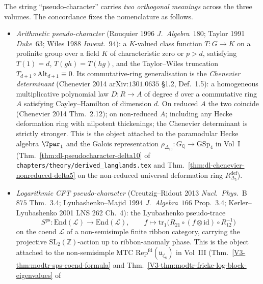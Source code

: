 \begin{description}[itemsep=4pt, leftmargin=2.0em, style=nextline]
\item[T6 (arithmetic pseudo-character vs LCFT pseudo-character).]
%
%
%
%
The string ``pseudo-character'' carries \emph{two orthogonal meanings}
across the three volumes. The concordance
fixes the nomenclature as follows.
\begin{itemize}
 \item \emph{Arithmetic pseudo-character} (Rouquier 1996
 \emph{J.\ Algebra}~$180$; Taylor 1991 \emph{Duke}~$63$; Wiles 1988
 \emph{Invent.}~$94$): a $K$-valued class function $T\colon G\to K$
 on a profinite group over a field $K$ of characteristic zero or
 $p>d$, satisfying $T(1)=d$, $T(gh)=T(hg)$, and the Taylor--Wiles
 truncation $T_{d+1}\circ\mathrm{Alt}_{d+1}\equiv 0$. Its
 commutative-ring generalisation is the \emph{Chenevier determinant}
 (Chenevier 2014 arXiv:$1301.0635$ \S1.2, Def.~1.5): a homogeneous
 multiplicative polynomial law $D\colon R\to A$ of degree $d$ over
 a commutative ring $A$ satisfying Cayley--Hamilton of dimension
 $d$. On reduced $A$ the two coincide (Chenevier 2014 Thm.~2.12); on
 non-reduced $A$; including any Hecke deformation ring with
 nilpotent thickenings; the Chenevier determinant is strictly
 stronger. This is the object attached to the paramodular Hecke
 algebra $\Tpar_1$ and the Galois representation
$\rho_{\Delta_{10}}\colon G_{\mathbb Q}\to\mathrm{GSp}_4$ in
Vol~I (Thm.~\ref{thm:dl-pseudocharacter-delta10} of
\texttt{chapters/theory/derived\_langlands.tex} and
Thm.~\ref{thm:dl-chenevier-nonreduced-delta5} on the non-reduced
universal deformation ring $R^{\mathrm{def}}_{\Delta_5}$).
 \item \emph{Logarithmic CFT pseudo-character} (Creutzig--Ridout 2013
 \emph{Nucl.~Phys.}~B~$875$ Thm.~3.4; Lyubashenko--Majid 1994
 \emph{J.\ Algebra}~$166$ Prop.~3.4; Kerler--Lyubashenko 2001 LNS
 262 Ch.~4): the Lyubashenko pseudo-trace
 \[
 S^{\mathrm{ps}}\colon
 \mathrm{End}(\mathcal L)\longrightarrow\mathrm{End}(\mathcal L),
 \qquad
 f \longmapsto \mathrm{tr}_1\bigl(R_{21}\circ (f\otimes\mathrm{id})
 \circ R_{12}^{-1}\bigr)
 \]
 on the coend $\mathcal L$ of a non-semisimple finite ribbon
 category, carrying the projective $\mathrm{SL}_2(\mathbb Z)$-action
 up to ribbon-anomaly phase. This is the object attached to the
 non-semisimple MTC $\mathrm{Rep}^{\mathrm{fd}}(\mathfrak
 u_{\zeta_8})$ in Vol~III (Thm.~\ref{V3-thm:modtr-sps-coend-formula}
 and Thm.~\ref{V3-thm:modtr-fricke-log-block-eigenvalues} of

\end{itemize}
\end{description}
